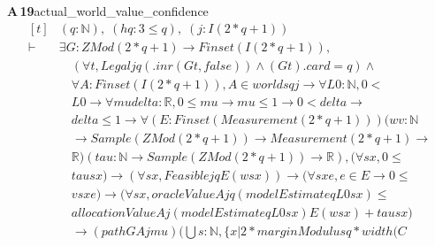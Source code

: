 \documentclass[conference]{IEEEtran}
\theoremstyle{definition}
\newcommand{\lean}[1]{\textsf{\footnotesize #1}}
\begin{document}
\noindent\textbf{A\,19}\quad\lean{actual\_world\_value\_confidence}
{\footnotesize\[ \begin{aligned}[t]
&(\mathit{q} : \mathbb{N} ),\; (\mathit{hq} : 3 \leq \mathit{q}),\; (\mathit{j} : \mathit{I} (2*\mathit{q}+1))\\
\vdash\;&\exists \mathit{G} : \mathit{ZMod} (2*\mathit{q}+1) \to \mathit{Finset} (\mathit{I} (2*\mathit{q}+1)),\\
&\quad (\forall \mathit{t},\mathit{Legal} \mathit{j} \mathit{q} (.\mathit{inr} (\mathit{G} \mathit{t},\mathit{false})) \wedge (\mathit{G} \mathit{t}).\mathit{card}=\mathit{q}) \wedge\\
&\quad \forall \mathit{A} : \mathit{Finset} (\mathit{I} (2*\mathit{q}+1)), \mathit{A} \in \mathit{worlds} \mathit{q} \mathit{j} \to \forall \mathit{L0} : \mathbb{N} ,0 <\\
&\quad \mathit{L0} \to \forall \mathit{mu} \mathit{delta} : \mathbb{R} ,0 \leq \mathit{mu} \to \mathit{mu} \leq 1 \to 0 < \mathit{delta} \to\\
&\quad \mathit{delta} \leq 1 \to \forall (\mathit{E} : \mathit{Finset} (\mathit{Measurement} (2*\mathit{q}+1))) (\mathit{w} \mathit{v} : \mathbb{N}\\
&\quad \to \mathit{Sample} (\mathit{ZMod} (2*\mathit{q}+1)) \to \mathit{Measurement} (2*\mathit{q}+1) \to\\
&\quad \mathbb{R} ) (\mathit{tau} : \mathbb{N} \to \mathit{Sample} (\mathit{ZMod} (2*\mathit{q}+1)) \to \mathbb{R} ), (\forall \mathit{s} \mathit{x},0 \leq\\
&\quad \mathit{tau} \mathit{s} \mathit{x}) \to (\forall \mathit{s} \mathit{x},\mathit{Feasible} \mathit{j} \mathit{q} \mathit{E} (\mathit{w} \mathit{s} \mathit{x})) \to (\forall \mathit{s} \mathit{x} \mathit{e},\mathit{e} \in \mathit{E} \to 0 \leq\\
&\quad \mathit{v} \mathit{s} \mathit{x} \mathit{e}) \to (\forall \mathit{s} \mathit{x},\mathit{oracleValue} \mathit{A} \mathit{j} \mathit{q} (\mathit{modelEstimate} \mathit{q} \mathit{L0} \mathit{s} \mathit{x}) \leq\\
&\quad \mathit{allocationValue} \mathit{A} \mathit{j} (\mathit{modelEstimate} \mathit{q} \mathit{L0} \mathit{s} \mathit{x}) \mathit{E} (\mathit{w} \mathit{s} \mathit{x})+\mathit{tau} \mathit{s} \mathit{x})\\
&\quad \to (\mathit{path} \mathit{G} \mathit{A} \mathit{j} \mathit{mu}) (⋃ \mathit{s} : \mathbb{N} ,\{ \mathit{x} | 2*\mathit{marginModulus} \mathit{q}*\mathit{width} (\mathit{C}
\end{aligned} \]}
\end{document}
